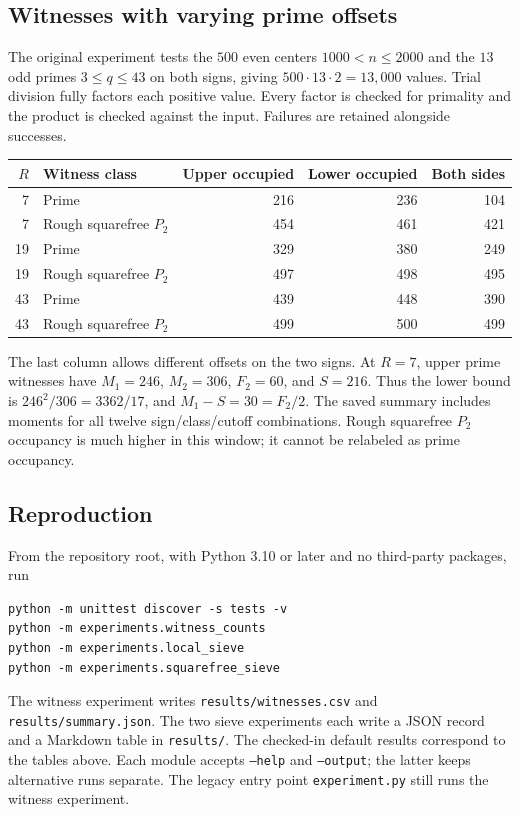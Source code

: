 \documentclass[11pt]{article}
\theoremstyle{definition}
\theoremstyle{remark}
\begin{document}
\subsection{Witnesses with varying prime offsets}
The original experiment tests the $500$ even centers $1000<n\le2000$
and the $13$ odd primes $3\le q\le43$ on both signs, giving
$500\cdot13\cdot2=13{,}000$ values. Trial division fully factors each
positive value. Every factor is checked for primality and the product
is checked against the input. Failures are retained alongside successes.

\begin{center}
\begin{tabular}{rlrrr}
\toprule
$R$ & Witness class & Upper occupied & Lower occupied & Both sides\\
\midrule
7 & Prime &216&236&104\\
7 & Rough squarefree $P_2$ &454&461&421\\
19 & Prime &329&380&249\\
19 & Rough squarefree $P_2$ &497&498&495\\
43 & Prime &439&448&390\\
43 & Rough squarefree $P_2$ &499&500&499\\
\bottomrule
\end{tabular}
\end{center}

The last column allows different offsets on the two signs.
At $R=7$, upper prime witnesses have $M_1=246$, $M_2=306$,
$F_2=60$, and $S=216$. Thus the lower bound is
$246^2/306=3362/17$, and $M_1-S=30=F_2/2$.
The saved summary includes moments for all twelve sign/class/cutoff
combinations. Rough squarefree $P_2$ occupancy is much higher in this
window; it cannot be relabeled as prime occupancy.

\subsection{Reproduction}
From the repository root, with Python 3.10 or later and no third-party
packages, run
\begin{verbatim}
python -m unittest discover -s tests -v
python -m experiments.witness_counts
python -m experiments.local_sieve
python -m experiments.squarefree_sieve
\end{verbatim}
The witness experiment writes \texttt{results/witnesses.csv} and
\texttt{results/summary.json}. The two sieve experiments each write
a JSON record and a Markdown table in \texttt{results/}.
The checked-in default results correspond to the tables above.
Each module accepts \texttt{--help} and \texttt{--output}; the latter
keeps alternative runs separate. The legacy entry point
\texttt{experiment.py} still runs the witness experiment.
\end{document}
